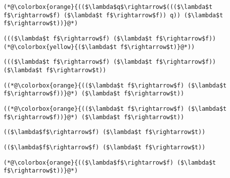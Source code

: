 \documentclass{beamer}
\begin{document}
\begin{frame}[fragile]{\CurrentSection}
\lstset{basicstyle=\ttfamily\small}\lstset{numbers=none}\lstset{language=ML}\begin{lstlisting}
(*@\colorbox{orange}{(($\lambda$q$\rightarrow$((($\lambda$t f$\rightarrow$f) ($\lambda$t f$\rightarrow$f)) q)) ($\lambda$t f$\rightarrow$t))}@*)
\end{lstlisting}
\pause\lstset{language=ML}\begin{lstlisting}
((($\lambda$t f$\rightarrow$f) ($\lambda$t f$\rightarrow$f)) (*@\colorbox{yellow}{($\lambda$t f$\rightarrow$t)}@*))
\end{lstlisting}

\end{frame}

\begin{frame}[fragile]{\CurrentSection}
\lstset{basicstyle=\ttfamily\small}\lstset{numbers=none}\lstset{language=ML}\begin{lstlisting}
((($\lambda$t f$\rightarrow$f) ($\lambda$t f$\rightarrow$f)) ($\lambda$t f$\rightarrow$t))
\end{lstlisting}
\pause\lstset{language=ML}\begin{lstlisting}
((*@\colorbox{orange}{(($\lambda$t f$\rightarrow$f) ($\lambda$t f$\rightarrow$f))}@*) ($\lambda$t f$\rightarrow$t))
\end{lstlisting}

\end{frame}

\begin{frame}[fragile]{\CurrentSection}
\lstset{basicstyle=\ttfamily\small}\lstset{numbers=none}\lstset{language=ML}\begin{lstlisting}
((*@\colorbox{orange}{(($\lambda$t f$\rightarrow$f) ($\lambda$t f$\rightarrow$f))}@*) ($\lambda$t f$\rightarrow$t))
\end{lstlisting}
\pause\lstset{language=ML}\begin{lstlisting}
(($\lambda$f$\rightarrow$f) ($\lambda$t f$\rightarrow$t))
\end{lstlisting}

\end{frame}

\begin{frame}[fragile]{\CurrentSection}
\lstset{basicstyle=\ttfamily\small}\lstset{numbers=none}\lstset{language=ML}\begin{lstlisting}
(($\lambda$f$\rightarrow$f) ($\lambda$t f$\rightarrow$t))
\end{lstlisting}
\pause\lstset{language=ML}\begin{lstlisting}
(*@\colorbox{orange}{(($\lambda$f$\rightarrow$f) ($\lambda$t f$\rightarrow$t))}@*)
\end{lstlisting}

\end{frame}
\end{document}
